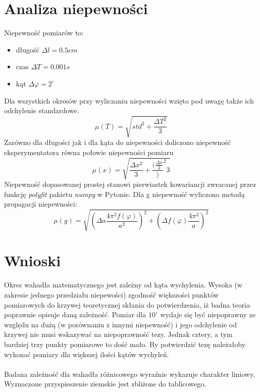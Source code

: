 \documentclass[a4paper,10pt]{article}
\begin{document}
\section{Analiza niepewności}
Niepewność pomiarów to:
\begin{itemize}
	\item długość $\Delta l = 0.5 cm$
	\item czas $\Delta T = 0.001 s$
	\item kąt $\Delta \varphi = 2 ^\circ$
\end{itemize}
Dla wszystkich okresów przy wyliczaniu niepewności wzięto pod uwagę także ich odchylenie standardowe. 
$$\mu(T) = \sqrt{std^2 + \frac{\Delta T^2}{3}}$$
Zarówno dla długości jak i dla kąta do niepewności doliczono niepewność eksperymentatora równa połowie niepewności pomiaru
$$\mu(x) = \sqrt{\frac{\Delta x^2}{3}+\frac{(\frac{\Delta x}{2}})^2{3}}$$
Niepewność dopasowanej prostej stanowi pierwiastek kowariancji zwracanej przez funkcję \emph{polyfit} pakietu \emph{numpy} w Pytonie. Dla g niepewność wyliczono metodą propagacji niepewności:
$$\mu(g) = \sqrt{(\Delta a \frac{4 \pi^2 f(\varphi)}{a^2})^2+(\Delta f(\varphi) \frac{4 \pi^2}{a})^2}$$
\section{Wnioski}
Okres wahadła matematycznego jest zależny od kąta wychylenia. Wysoka (w zakresie jednego przedziału niepewości) zgodność większości punktów pomiarowych do krzywej teoretycznej skłania do potwierdzenia, iż badna teoria poprawnie opisuje daną zależność. Pomiar dla $10^\circ$ wydaje się być niepoprawny ze względu na dużą (w porównaniu z innymi niepewność) i jego odchylenie od krzywej nie musi wskazywać na niepoprawność tezy. Jednak cztery, a tym bardziej trzy punkty pomiarowe to dość mało. By potwierdzić tezę należałoby wykonać pomiary dla większej ilości kątów wychyleń.\\
\\
Badana zależność dla wahadła różnicowego wyraźnie wykazuje charakter liniowy. Wyznaczone przyspieszenie ziemskie jest zbliżone do tablicowego. %
\end{document}
